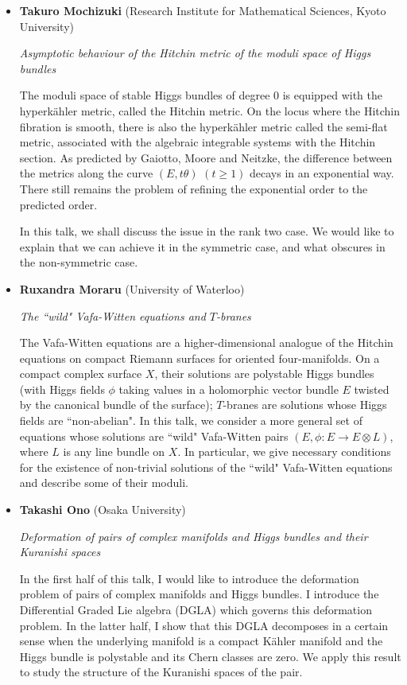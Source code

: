 \documentclass{article}
\begin{document}
\begin{itemize}
\newpage
\item {\bf Takuro Mochizuki} (Research Institute for Mathematical Sciences, Kyoto University)

{\it Asymptotic behaviour of the Hitchin metric of the moduli space of Higgs bundles}

The moduli space of stable Higgs bundles of degree $0$ is equipped with the hyperk\"ahler metric, called the Hitchin metric. On the locus where the Hitchin fibration is smooth, there is also the hyperk\"ahler metric called the semi-flat metric, associated with the algebraic integrable systems with the Hitchin section. As predicted by Gaiotto, Moore and Neitzke, the difference between the metrics along the curve $(E,t\theta)$ $(t\geq 1)$ decays in an exponential way. There still remains the problem of refining the exponential order to the predicted order.

In this talk, we shall discuss the issue in the rank two case. We would like to explain that we can achieve it in the symmetric case, and what obscures in the non-symmetric case.


\item {\bf Ruxandra Moraru} (University of Waterloo)

{\it The ``wild" Vafa-Witten equations and $T$-branes}

The Vafa-Witten equations are a higher-dimensional analogue of the Hitchin equations on compact Riemann surfaces for oriented four-manifolds. On a compact complex surface $X$, their solutions are polystable Higgs bundles (with Higgs fields $\phi$ taking values in a holomorphic vector bundle $E$ twisted by the canonical bundle of the surface); $T$-branes are solutions whose Higgs fields are ``non-abelian". In this talk, we consider a more general set of equations whose solutions are ``wild" Vafa-Witten pairs $(E,\phi: E \rightarrow E \otimes L)$, where $L$ is any line bundle on $X$. In particular, we give necessary conditions for the existence of non-trivial solutions of the ``wild" Vafa-Witten equations and describe some of their moduli.


\item {\bf Takashi Ono} (Osaka University)

{\it Deformation of pairs of complex manifolds and Higgs bundles and their Kuranishi spaces}

In the first half of this talk, I would like to introduce the deformation problem of pairs of complex manifolds and Higgs bundles. I introduce the Differential Graded Lie algebra (DGLA) which governs this deformation problem. In the latter half, I show that this DGLA decomposes in a certain sense when the underlying manifold is a compact K\"ahler manifold and the Higgs bundle is polystable and its Chern classes are zero. We apply this result to study the structure of the Kuranishi spaces of the pair.


\end{itemize}
\end{document}
